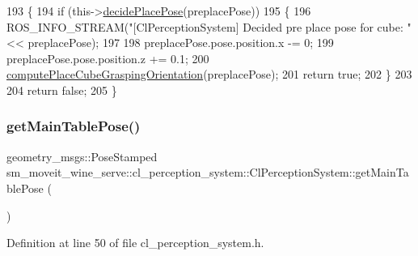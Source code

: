 \begin{DoxyCode}
193             \{
194                 \textcolor{keywordflow}{if} (this->\hyperlink{classsm__moveit__wine__serve_1_1cl__perception__system_1_1ClPerceptionSystem_a933bd942b37429d282180d19734aab85}{decidePlacePose}(preplacePose))
195                 \{
196                     ROS\_INFO\_STREAM(\textcolor{stringliteral}{"[ClPerceptionSystem] Decided pre place pose for cube: "} << 
      preplacePose);
197 
198                     preplacePose.pose.position.x -= 0;
199                     preplacePose.pose.position.z += 0.1;
200                     \hyperlink{classsm__moveit__wine__serve_1_1cl__perception__system_1_1ClPerceptionSystem_af789dcdfce466401dc70d0b3224d1093}{computePlaceCubeGraspingOrientation}(preplacePose);
201                     \textcolor{keywordflow}{return} \textcolor{keyword}{true};
202                 \}
203 
204                 \textcolor{keywordflow}{return} \textcolor{keyword}{false};
205             \}
\end{DoxyCode}
\mbox{\label{classsm__moveit__wine__serve_1_1cl__perception__system_1_1ClPerceptionSystem_ad9dec4dd1bb5ddebd6ad76ccd6b5bbf0}} 
\subsubsection{\texorpdfstring{get\+Main\+Table\+Pose()}{getMainTablePose()}}
{\footnotesize\ttfamily geometry\+\_\+msgs\+::\+Pose\+Stamped sm\+\_\+moveit\+\_\+wine\+\_\+serve\+::cl\+\_\+perception\+\_\+system\+::\+Cl\+Perception\+System\+::get\+Main\+Table\+Pose (\begin{DoxyParamCaption}{ }\end{DoxyParamCaption})\hspace{0.3cm}{\ttfamily [inline]}}



Definition at line 50 of file cl\+\_\+perception\+\_\+system.\+h.



